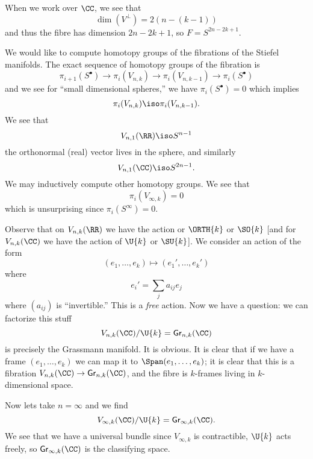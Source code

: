 When we work over $\CC$, we see that
\begin{equation}
\dim(V^{\bot})=2\left(n-(k-1)\right)
\end{equation}
and thus the fibre has dimension $2n-2k+1$, so
$F=S^{2n-2k+1}$. 

We would like to compute homotopy groups of the fibrations of the
Stiefel manifolds. The exact sequence of homotopy groups of the
fibration is
\begin{equation}
\pi_{i+1}(S^{\bullet})\to\pi_{i}(V_{n,k})\to\pi_{i}(V_{n,k-1})\to\pi_{i}(S^{\bullet})
\end{equation}
and we see for ``small dimensional spheres,'' we have
$\pi_{i}(S^{\bullet})=0$ which implies
\begin{equation}
\pi_{i}(V_{n,k})\iso\pi_{i}(V_{n,k-1}).
\end{equation}
We see that
\begin{equation}
V_{n,1}(\RR)\iso S^{n-1}
\end{equation}
the orthonormal (real) vector lives in the sphere, and similarly
\begin{equation}
V_{n,1}(\CC)\iso S^{2n-1}.
\end{equation}
We may inductively compute other homotopy groups. We see that
\begin{equation}
\pi_{i}(V_{\infty,k})=0
\end{equation}
which is unsurprising since $\pi_{i}(S^{\infty})=0$.

Observe that on $V_{n,k}(\RR)$ we have the action or $\ORTH{k}$
or $\SO{k}$ [and for $V_{n,k}(\CC)$ we have the action of $\U{k}$
or $\SU{k}$]. We consider an action of the form
\begin{equation}
(e_{1},\dots,e_{k})\mapsto(e_{1}',\dots,e_{k}')
\end{equation}
where
\begin{equation}
e_{i}'=\sum_{j}a_{ij}e_{j}
\end{equation}
where $(a_{ij})$ is ``invertible.'' This is a \emph{free}
action. Now we have a question: we can factorize this stuff
\begin{equation}
V_{n,k}(\CC)/\U{k}=\Gr_{n,k}(\CC)
\end{equation}
is precisely the Grassmann manifold. It is obvious. It is clear
that if we have a frame $(e_{1},\dots,e_{k})$ we can map it to 
$\Span(e_{1},\dots,e_{k})$; it is clear that this is a fibration
$V_{n,k}(\CC)\to \Gr_{n,k}(\CC)$, and the fibre is $k$-frames
living in $k$-dimensional space.

Now lets take $n=\infty$ and we find
\begin{equation}
V_{\infty,k}(\CC)/\U{k}=\Gr_{\infty,k}(\CC).
\end{equation}
We see that we have a universal bundle 
since $V_{\infty,k}$ is
contractible, $\U{k}$ acts freely, so $\Gr_{\infty,k}(\CC)$ is the
classifying space.

